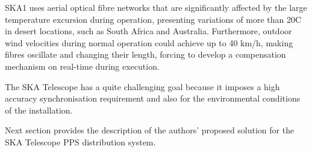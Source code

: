 SKA1 uses aerial optical fibre networks that are
significantly affected by the large temperature excursion during operation,
presenting variations of more than 20\degree C in desert locations, such as South Africa and Australia. Furthermore, outdoor wind velocities during normal operation could achieve up to 40 km/h, making fibres oscillate and changing their length, forcing to develop a compensation mechanism on real-time during execution.

The SKA Telescope has a quite challenging goal because it imposes a high accuracy synchronisation requirement and also for the environmental conditions of the installation.

Next section provides the description of the authors' proposed solution for the SKA Telescope PPS distribution system. 


